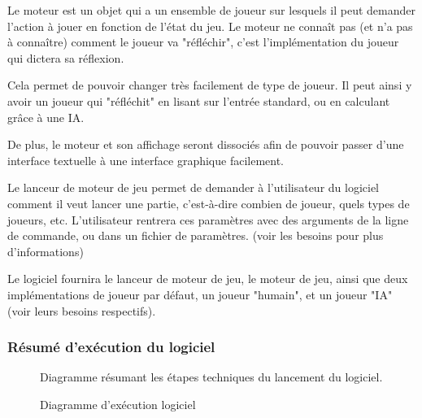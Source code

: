 \documentclass{article}
\begin{document}
Le moteur est un objet qui a un ensemble de joueur sur lesquels il peut demander l'action à jouer en fonction de l'état du jeu. Le moteur ne connaît pas (et n'a pas à connaître) comment le joueur va "réfléchir", c'est l'implémentation du joueur qui dictera sa réflexion.

Cela permet de pouvoir changer très facilement de type de joueur. Il peut ainsi y avoir un joueur qui "réfléchit" en lisant sur l'entrée standard, ou en calculant grâce à une IA.

De plus, le moteur et son affichage seront dissociés afin de pouvoir passer d'une interface textuelle à une interface graphique facilement.

\bigskip

Le lanceur de moteur de jeu permet de demander à l'utilisateur du logiciel comment il veut lancer une partie, c'est-à-dire combien de joueur, quels types de joueurs, etc. L'utilisateur rentrera ces paramètres avec des arguments de la ligne de commande, ou dans un fichier de paramètres. (voir les besoins pour plus d'informations)

\bigskip

Le logiciel fournira le lanceur de moteur de jeu, le moteur de jeu, ainsi que deux implémentations de joueur par défaut, un joueur "humain", et un joueur "IA" (voir leurs besoins respectifs).

\bigskip

\subsubsection{Résumé d'exécution du logiciel}

\bigskip

\begin{figure}[h!]
    \centering
    
    
    \caption{Diagramme d'exécution logiciel}
    \label{fig:diag_exec}
    \vspace{0.5cm}Diagramme résumant les étapes techniques du lancement du logiciel. 
\end{figure}
\end{document}
